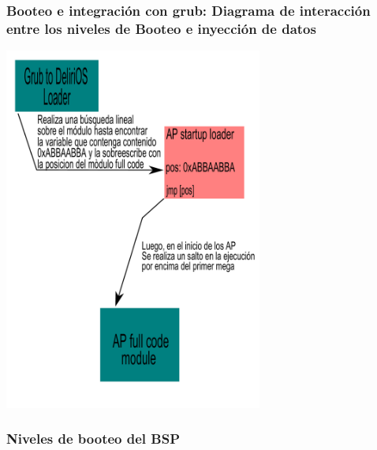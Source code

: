 	\subsubsection{Booteo e integración con grub: Diagrama de interacción entre los niveles de Booteo e inyección de datos}

	\begin{center}
		\includegraphics[height=12cm]{images/modules-diagram.pdf} 
	\end{center}

	\newpage

	\subsubsection{Niveles de booteo del BSP}

